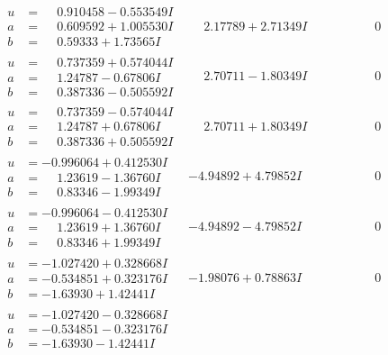\documentclass[1p]{elsarticle_modified}
\theoremstyle{definition}
\begin{document}
$$\begin{array}{c|c|c}
\begin{aligned}
u &= \phantom{-}0.910458 - 0.553549 I \\
a &= \phantom{-}0.609592 + 1.005530 I \\
b &= \phantom{-}0.59333 + 1.73565 I\end{aligned}
 & \phantom{-}2.17789 + 2.71349 I & \phantom{-0.000000 } 0 \\ \hline\begin{aligned}
u &= \phantom{-}0.737359 + 0.574044 I \\
a &= \phantom{-}1.24787 - 0.67806 I \\
b &= \phantom{-}0.387336 - 0.505592 I\end{aligned}
 & \phantom{-}2.70711 - 1.80349 I & \phantom{-0.000000 } 0 \\ \hline\begin{aligned}
u &= \phantom{-}0.737359 - 0.574044 I \\
a &= \phantom{-}1.24787 + 0.67806 I \\
b &= \phantom{-}0.387336 + 0.505592 I\end{aligned}
 & \phantom{-}2.70711 + 1.80349 I & \phantom{-0.000000 } 0 \\ \hline\begin{aligned}
u &= -0.996064 + 0.412530 I \\
a &= \phantom{-}1.23619 - 1.36760 I \\
b &= \phantom{-}0.83346 - 1.99349 I\end{aligned}
 & -4.94892 + 4.79852 I & \phantom{-0.000000 } 0 \\ \hline\begin{aligned}
u &= -0.996064 - 0.412530 I \\
a &= \phantom{-}1.23619 + 1.36760 I \\
b &= \phantom{-}0.83346 + 1.99349 I\end{aligned}
 & -4.94892 - 4.79852 I & \phantom{-0.000000 } 0 \\ \hline\begin{aligned}
u &= -1.027420 + 0.328668 I \\
a &= -0.534851 + 0.323176 I \\
b &= -1.63930 + 1.42441 I\end{aligned}
 & -1.98076 + 0.78863 I & \phantom{-0.000000 } 0 \\ \hline\begin{aligned}
u &= -1.027420 - 0.328668 I \\
a &= -0.534851 - 0.323176 I \\
b &= -1.63930 - 1.42441 I\end{aligned}

\end{array}$$
\end{document}

